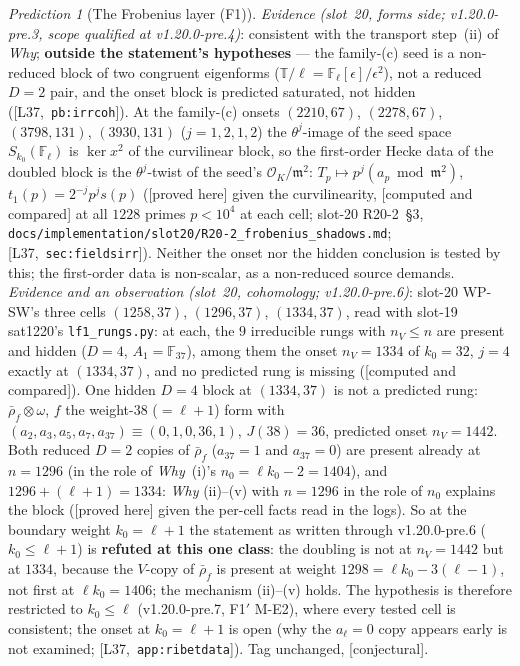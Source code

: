 \documentclass[11pt]{article}
\theoremstyle{remark}
\newtheorem{prediction}[theorem]{Prediction}
\newcommand{\F}{\mathbb{F}}
\newcommand{\Fl}{\F_\ell}
\newcommand{\T}{\mathbb{T}}
\newcommand{\m}{\mathfrak{m}}
\newcommand{\PROVED}{\textsf{[proved here]}}
\newcommand{\CONJ}{\textsf{[conjectural]}}
\newcommand{\CMPD}{\textsf{[computed and compared]}}   %
\newcommand{\Lcite}[1]{[L37,~\texttt{#1}]}             %
\begin{document}
\begin{prediction}[The Frobenius layer (F1)]
\emph{Evidence (slot~20, forms side; v1.20.0-pre.3, scope qualified at v1.20.0-pre.4)}: consistent with the transport step~(ii) of \emph{Why}; \textbf{outside the
statement's hypotheses} --- the family-(c) seed is a non-reduced block of two congruent eigenforms ($\T/\ell=\Fl[\epsilon]/\epsilon^{2}$), not a reduced $D=2$ pair, and
the onset block is predicted saturated, not hidden (\Lcite{pb:irrcoh}). At the family-(c) onsets $(2210,67)$, $(2278,67)$, $(3798,131)$, $(3930,131)$
($j=1,2,1,2$) the $\theta^{j}$-image of the seed space $S_{k_0}(\Fl)$ is $\ker x^{2}$ of the curvilinear block, so the first-order Hecke data of the doubled block is the
$\theta^{j}$-twist of the seed's $\mathcal O_K/\m^{2}$: $T_p\mapsto p^{j}(a_p\bmod\m^{2})$, $t_1(p)=2^{-j}p^{j}s(p)$ (\PROVED{} given the curvilinearity, \CMPD{} at all $1228$
primes $p<10^{4}$ at each cell; slot-20 R20-2~\S3, \texttt{docs/implementation/slot20/R20-2\_frobenius\_shadows.md}; \Lcite{sec:fieldsirr}). Neither the onset nor the hidden conclusion is tested by this; the first-order data is non-scalar, as a non-reduced source demands.
\emph{Evidence and an observation (slot~20, cohomology; v1.20.0-pre.6)}: slot-20 WP-SW's three cells $(1258,37)$, $(1296,37)$, $(1334,37)$, read with slot-19 sat1220's
\texttt{lf1\_rungs.py}: at each, the $9$ irreducible rungs with $n_V\le n$ are present and hidden ($D=4$, $A_1=\F_{37}$), among them the onset $n_V=1334$ of $k_0=32$, $j=4$ exactly at $(1334,37)$, and
no predicted rung is missing (\CMPD). One hidden $D=4$ block at $(1334,37)$ is not a predicted rung: $\bar\rho_f\otimes\omega$, $f$ the weight-$38$ ($=\ell+1$) form with
$(a_2,a_3,a_5,a_7,a_{37})\equiv(0,1,0,36,1)$, $J(38)=36$, predicted onset $n_V=1442$. Both reduced $D=2$ copies of $\bar\rho_f$ ($a_{37}=1$ and $a_{37}=0$) are present already at $n=1296$ (in the role of \emph{Why}~(i)'s $n_0=\ell k_0-2=1404$), and
$1296+(\ell+1)=1334$: \emph{Why} (ii)--(v) with $n=1296$ in the role of $n_0$ explains the block (\PROVED{} given the per-cell facts read in the logs). So at the boundary weight $k_0=\ell+1$ the statement as written through v1.20.0-pre.6 ($k_0\le\ell+1$) is \textbf{refuted at this one class}: the
doubling is not at $n_V=1442$ but at $1334$, because the $V$-copy of $\bar\rho_f$ is present at weight $1298=\ell k_0-3(\ell-1)$, not first at
$\ell k_0=1406$; the mechanism (ii)--(v) holds. The hypothesis is therefore restricted to $k_0\le\ell$ (v1.20.0-pre.7, F1$'$ M-E2), where every tested cell is
consistent; the onset at $k_0=\ell+1$ is open (why the $a_\ell=0$ copy appears early is not examined; \Lcite{app:ribetdata}). Tag unchanged, \CONJ.
\end{prediction}
\end{document}
